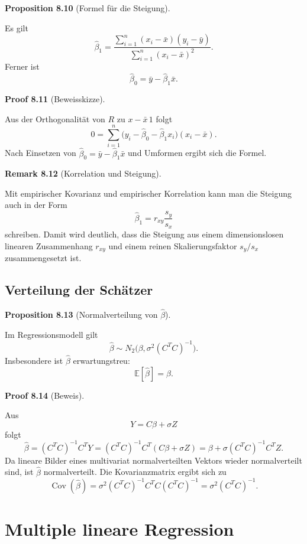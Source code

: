 \documentclass[10pt, letterpaper]{article}
\newcommand{\CustomHeading}[3]{%
  \par\medskip\noindent%
  \textbf{#1 #2} \textnormal{(#3)}.\enskip%
}
\newenvironment{PROP}[2]{\CustomHeading{Proposition}{#1}{#2}}{}
\newenvironment{REM}[2]{\CustomHeading{Remark}{#1}{#2}}{}
\newenvironment{PROOF}[2]{\CustomHeading{Proof}{#1}{#2}}{}
\begin{document}
\begin{PROP}{8.10}{Formel für die Steigung}
Es gilt
\[
\hat\beta_1
=
\frac{\sum_{i=1}^n (x_i-\bar x)(y_i-\bar y)}
{\sum_{i=1}^n (x_i-\bar x)^2}.
\]
Ferner ist
\[
\hat\beta_0=\bar y-\hat\beta_1\bar x.
\]
\end{PROP}

\begin{PROOF}{8.11}{Beweisskizze}
Aus der Orthogonalität von \(R\) zu \(x-\bar x\,1\) folgt
\[
0=\sum_{i=1}^n \bigl(y_i-\hat\beta_0-\hat\beta_1x_i\bigr)(x_i-\bar x).
\]
Nach Einsetzen von \(\hat\beta_0=\bar y-\hat\beta_1\bar x\) und Umformen ergibt sich die Formel.
\end{PROOF}

\begin{REM}{8.12}{Korrelation und Steigung}
Mit empirischer Kovarianz und empirischer Korrelation kann man die Steigung auch in der Form
\[
\hat\beta_1=r_{xy}\frac{s_y}{s_x}
\]
schreiben. Damit wird deutlich, dass die Steigung aus einem dimensionslosen linearen Zusammenhang \(r_{xy}\) und einem reinen Skalierungsfaktor \(s_y/s_x\) zusammengesetzt ist.
\end{REM}

\subsection{Verteilung der Schätzer}

\begin{PROP}{8.13}{Normalverteilung von \(\hat\beta\)}
Im Regressionsmodell gilt
\[
\hat\beta \sim N_2\bigl(\beta,\sigma^2(C^TC)^{-1}\bigr).
\]
Insbesondere ist \(\hat\beta\) erwartungstreu:
\[
\mathbb E[\hat\beta]=\beta.
\]
\end{PROP}

\begin{PROOF}{8.14}{Beweis}
Aus
\[
Y=C\beta+\sigma Z
\]
folgt
\[
\hat\beta=(C^TC)^{-1}C^TY
=
(C^TC)^{-1}C^T(C\beta+\sigma Z)
=
\beta+\sigma (C^TC)^{-1}C^TZ.
\]
Da lineare Bilder eines multivariat normalverteilten Vektors wieder normalverteilt sind, ist \(\hat\beta\) normalverteilt. Die Kovarianzmatrix ergibt sich zu
\[
\operatorname{Cov}(\hat\beta)
=
\sigma^2(C^TC)^{-1}C^T C (C^TC)^{-1}
=
\sigma^2(C^TC)^{-1}.
\]
\end{PROOF}

\section{Multiple lineare Regression}
\end{document}
